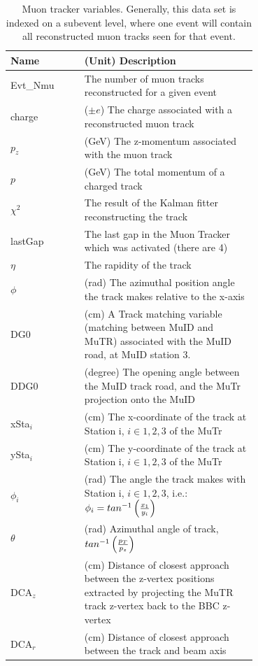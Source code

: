 \begin{table}
  \centering
  \begin{tabular}{l p{0.7\linewidth}}
    \toprule
    \textbf{Name} & \textbf{(Unit) Description} \\
    \midrule
    Evt\_Nmu & The number of muon tracks reconstructed for a given event \\
    charge & ($\pm e$) The charge associated with a reconstructed muon track \\ 
    $p_z$ & (GeV) The z-momentum associated with the muon track \\
    $p$ & (GeV) The total momentum of a charged track \\
    $\chi^2$ & The result of the Kalman fitter reconstructing the track \\
    lastGap & The last gap in the Muon Tracker which was activated (there are 4) \\
    $\eta$ & The rapidity of the track \\
    $\phi$ & (rad) The azimuthal position angle the track makes relative to the x-axis \\
    DG0 & (cm) A Track matching variable (matching between MuID and MuTR) associated with the MuID road, at MuID station 3. \\
    DDG0 & (degree)  The opening angle between the MuID track road, and the MuTr projection onto the MuID \\
    xSta${}_i$ & (cm) The x-coordinate of the track at Station i,  $i\in{1,2,3}$ of the MuTr \\
    ySta${}_i$ & (cm) The y-coordinate of the track at Station i, $i\in{1,2,3}$ of the MuTr \\

    $\phi_i$ & (rad) The angle the track makes with Station i, $i\in{1,2,3}$, i.e.: $\phi_i = tan^{-1}\left({{x_1}\over{y_i}}\right)$ \\
    $\theta$ & (rad) Azimuthal angle of track, $tan^{-1}\left({p_T \over p_z}\right)$ \\
    DCA${}_z$ & (cm) Distance of closest approach between the z-vertex positions extracted by projecting the MuTR track z-vertex back to the BBC z-vertex \\
    DCA${}_r$ & (cm) Distance of closest approach between the track and beam axis \\ 
    \bottomrule
  \end{tabular}
  \caption{
    Muon tracker variables. Generally, this data set is indexed on a subevent 
    level, where one event will contain all reconstructed muon tracks seen for 
    that event.
  }
  \label{tab:mutr_variables}
\end{table}

